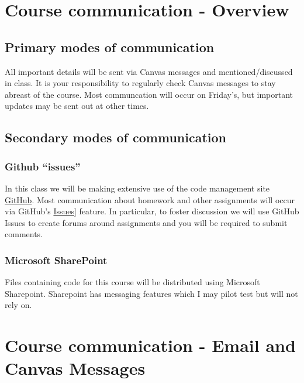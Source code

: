 \documentclass[
]{book}
\begin{document}
\hypertarget{course-communication---overview}{%
\chapter{Course communication - Overview}\label{course-communication---overview}}

\hypertarget{primary-modes-of-communication}{%
\section{Primary modes of communication}\label{primary-modes-of-communication}}

All important details will be sent via Canvas messages and mentioned/discussed in class. It is your responsibility to regularly check Canvas messages to stay abreast of the course. Most communcation will occur on Friday's, but important updates may be sent out at other times.

\hypertarget{secondary-modes-of-communication}{%
\section{Secondary modes of communication}\label{secondary-modes-of-communication}}

\hypertarget{github-issues}{%
\subsection{Github ``issues''}\label{github-issues}}

In this class we will be making extensive use of the code management site \href{https://github.com/}{GitHub}. Most communication about homework and other assignments will occur via GitHub's \href{https://guides.github.com/features/issues/}{Issues}{]} feature. In particular, to foster discussion we will use GitHub Issues to create forums around assignments and you will be required to submit comments.

\hypertarget{microsoft-sharepoint}{%
\subsection{Microsoft SharePoint}\label{microsoft-sharepoint}}

Files containing code for this course will be distributed using Microsoft Sharepoint. Sharepoint has messaging features which I may pilot test but will not rely on.

\hypertarget{email_and_canvas_msg}{%
\chapter{Course communication - Email and Canvas Messages}\label{email_and_canvas_msg}}
\end{document}
